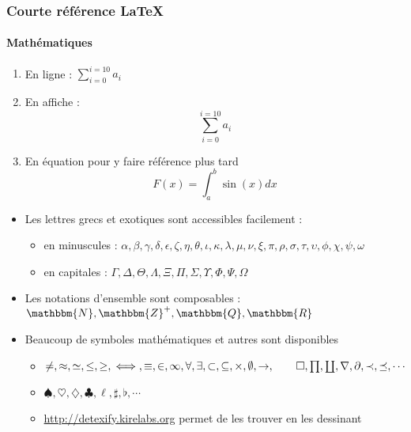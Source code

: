 \begin{frame}[allowframebreaks] %
  \frametitle{Courte référence \LaTeX{}}
  \framesubtitle{Mathématiques}


  \begin{enumerate}
  \item En ligne : $ \sum_{i=0}^{i=10} a_{i} $

  \item En affiche :
    \begin{displaymath}
      \sum_{i=0}^{i=10} a_{i}
    \end{displaymath}

  \item En équation pour y faire référence plus tard
    \begin{equation}
      \label{eq:1}
      F(x) = \int_{a}^{b}\sin(x)dx 
    \end{equation}
  \end{enumerate}
  

  \begin{itemize}
  \item Les lettres grecs et exotiques sont accessibles facilement :

    \begin{itemize}
    \item en minuscules : $ \alpha, \beta, \gamma, \delta, \epsilon, \zeta, \eta, \theta, \iota, \kappa, \lambda, \mu, \nu, \xi, \pi, \rho, \sigma, \tau, \upsilon, \phi, \chi, \psi, \omega $
    \item en capitales : $ \Gamma, \Delta, \Theta, \Lambda, \Xi, \Pi, \Sigma, \Upsilon, \Phi, \Psi, \Omega $
    \end{itemize}

  \item Les notations d'ensemble sont composables : $ \mathbbm{N}, \mathbbm{Z}^{+}, \mathbbm{Q}, \mathbbm{R} $

  \item Beaucoup de symboles mathématiques et autres sont disponibles

    \begin{itemize}
    \item $ \neq, \approx, \simeq, \le, \ge, \iff, \equiv, \in, \infty, \forall, \exists, \subset, \subseteq, \times, \emptyset, \rightarrow, \qed, \prod, \coprod, \nabla, \partial, \prec, \preceq, \cdots $
    \item $ \spadesuit, \heartsuit, \diamondsuit, \clubsuit, \ell, \sharp, \flat, \cdots $
    \item \url{http://detexify.kirelabs.org} permet de les trouver en les dessinant
    \end{itemize}


\end{itemize}
\end{frame}
